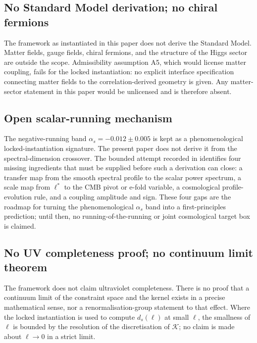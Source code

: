 ﻿\documentclass[12pt,a4paper]{article}
\theoremstyle{definition}
\begin{document}
\subsection{No Standard Model derivation; no chiral fermions}

The framework as instantiated in this paper does not derive the Standard Model. Matter fields, gauge fields, chiral fermions, and the structure of the Higgs sector are outside the scope. Admissibility assumption A5, which would license matter coupling, fails for the locked instantiation: no explicit interface specification connecting matter fields to the correlation-derived geometry is given. Any matter-sector statement in this paper would be unlicensed and is therefore absent.

\subsection{Open scalar-running mechanism}

The negative-running band $\alpha_s=-0.012\pm0.005$ is kept as a phenomenological locked-instantiation signature. The present paper does not derive it from the spectral-dimension crossover. The bounded attempt recorded in  identifies four missing ingredients that must be supplied before such a derivation can close: a transfer map from the smooth spectral profile to the scalar power spectrum, a scale map from $\ell^\ast$ to the CMB pivot or e-fold variable, a cosmological profile-evolution rule, and a coupling amplitude and sign. These four gaps are the roadmap for turning the phenomenological $\alpha_s$ band into a first-principles prediction; until then, no running-of-the-running or joint cosmological target box is claimed.

\subsection{No UV completeness proof; no continuum limit theorem}

The framework does not claim ultraviolet completeness. There is no proof that a continuum limit of the constraint space and the kernel exists in a precise mathematical sense, nor a renormalisation-group statement to that effect. Where the locked instantiation is used to compute $d_s(\ell)$ at small $\ell$, the smallness of $\ell$ is bounded by the resolution of the discretisation of $\mathcal{K}$; no claim is made about $\ell \to 0$ in a strict limit.
\end{document}
